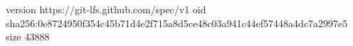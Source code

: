 version https://git-lfs.github.com/spec/v1
oid sha256:0e8724950f354c45b71d4e2f715a8d5ce48c03a941c44ef57448a4dc7a2997e5
size 43888
